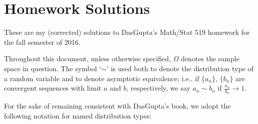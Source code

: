 \section{Homework Solutions}
These are my (corrected) solutions to DasGupta's Math/Stat 519 homework for
the fall semester of 2016.

Throughout this document, unless otherwise specified, \(\Omega\) denotes
the sample space in question. The symbol `\(\sim\)' is used both to denote
the distribution type of a random variable and to denote asymptotic
equivalence; i.e., if \(\{a_n\}\), \(\{b_n\}\) are convergent sequences
with limit \(a\) and \(b\), respectively, we say \(a_n\sim b_n\) if
\(\frac{a_n}{b_n}\to 1\).

For the sake of remaining consistent with DasGupta's book, we adopt the
following notation for named distribution types:

